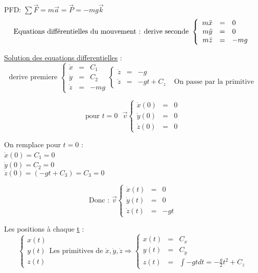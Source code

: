 PFD: $\sum\vec{F} = m\vec{a} = \vec{P} = -mg\vec{k} $
\[ \text{Equations différentielles du mouvement : ~\\
	derive seconde }\left\{ \begin{array}{rcl}
	m\ddot{x} &=& 0 \\
	m\ddot{y} &=& 0 \\
m\ddot{z} &=& -mg \end{array} \right. \]

\ul{Solution des equations differentielles} : ~\\
\[\text{derive premiere } \left\{ \begin{array}{rcl}
			\dot{x} &=&C_1 \\
			\dot{y} &=&C_2 \\
			\dot{z} &=& -mg
		\end{array}\right. \left\{\begin{array}{rclr}
			\ddot{z} &=& -g \\
		\dot{z} &=& -gt + C_z & \text{ On passe par la primitive} \end{array}\right.
\]

\[\text{pour } t=0 \text{ } \vec{v} \left\{ \begin{array}{rcl}
			\dot{x}(0) &=&0 \\
			\dot{y}(0) &=&0 \\
	\dot{z}(0) &=&0 \end{array}\right.\] 

			On remplace pour $t=0$ : ~\\
			$\dot{x}(0) = C_1 = 0$ ~\\
			$\dot{y}(0) = C_2 = 0$ ~\\
			$\dot{z}(0) = (-gt+C_3) = C_3 = 0$
			
			\[\text{Donc : } \vec{v} \left\{ \begin{array}{rcl} 
			\dot{x}(t) &=&0 \\
			\dot{y}(t) &=&0 \\
			\dot{z}(t) &=& -gt \end{array} \right. \]

Les positions à chaque \ul{t} : \[\left\{ \begin{array}{r}
			x(t) \\
			y(t) \\
		z(t) \end{array} \right.
		\text{Les primitives de } \dot{x}, \dot{y}, \dot{z} \Rightarrow \left\{ \begin{array}{rcl}
			x(t) &=& C_x \\
			y(t) &=& C_y \\
			z(t) &=& \int{-gt dt} = -\frac{g}{2}t^2 + C_z \end{array} \right. \]

